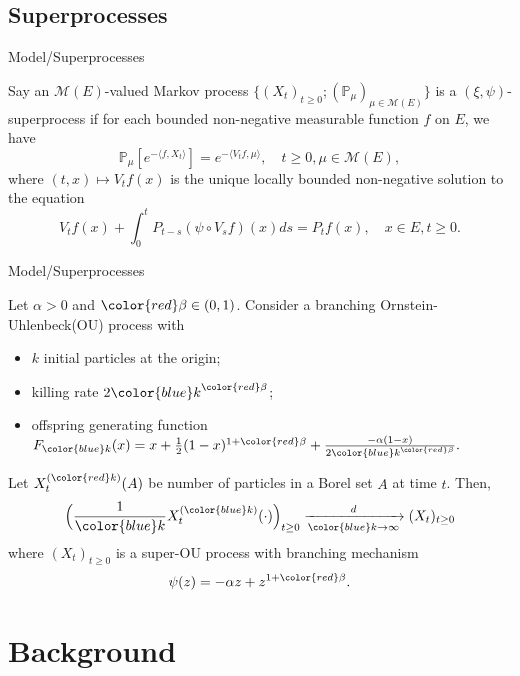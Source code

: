 \documentclass[xcolor=dvipsnames]{beamer}
\begin{document}
\subsection{Superprocesses}
\begin{frame}{Model/Superprocesses}
\begin{definition}[Superprocess]
	Say an $\mathcal M(E)$-valued Markov process $\{(X_t)_{t\geq 0}; (\mathbb P_\mu)_{\mu\in \mathcal M(E)}\}$ is a $(\xi,\psi)$-superprocess if for each bounded non-negative measurable function $f$ on $E$, we have
\begin{equation}
\label{eq: def of V_t}
    \mathbb{P}_{\mu}[e^{-\langle f,X_t \rangle}]
    = e^{-\langle V_tf, \mu \rangle},
    \quad t\geq 0, \mu \in \mathcal M(E),
\end{equation}
	where $(t,x) \mapsto V_tf(x)$ is the unique locally bounded non-negative solution to the equation
\begin{equation}
	V_tf(x) +  \int_0^t P_{t-s}(\psi \circ V_{s}f)(x)ds
	= P_tf(x),
    \quad x\in E, t\geq 0.
\end{equation}
\end{definition}
\end{frame}

\begin{frame}{Model/Superprocesses}
\begin{example}
	Let $\alpha >0$ and ${\color{red} \beta} \in (0,1)$.
	Consider a branching Ornstein-Uhlenbeck(OU) process with
\begin{itemize}
\item
	{\color{blue} $k$} initial particles at the origin;
\item
	killing rate  $2{\color{blue} k}^{\color{red}\beta}$;
\item
	offspring generating function
\(
	F_{\color{blue} k}(x) =x +\frac{1}{2}(1-x)^{1+{\color{red}\beta}} + \frac{-\alpha (1-x)}{2{\color{blue} k}^{\color{red}\beta}}.
\)
\end{itemize}
	Let $X^{({\color{red} k})}_t(A)$ be number of particles in a Borel set $A$ at time $t$. 
	Then,
\[
	\Big(\frac{1}{\color{blue} k} X^{({\color{blue} k})}_t(\cdot)\Big)_{t\geq 0}
	\xrightarrow[{\color{blue} k}\to \infty]{d} (X_t)_{t\geq 0}
\]
where $(X_t)_{t\geq 0}$ is a super-OU process with branching mechanism \[\psi(z) = -\alpha z + z^{1+{\color{red}\beta}}.\]
\end{example}
\end{frame}

\section{Background}
\end{document}
